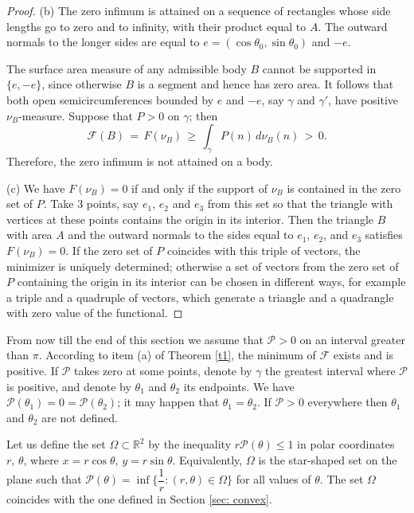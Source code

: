 \documentclass[a4paper,12pt]{article}
\newcommand {\FF}{F}
\newcommand {\FFF}{\mathcal{F}}
\newcommand {\PP}{P}
\newcommand {\PPP}{\mathcal{P}}
\theoremstyle{remark}
\theoremstyle{definition}
\begin{document}
\begin{proof}
(b) The zero infimum is attained on a sequence of rectangles whose side lengths go to zero and to infinity, with their product equal to $A$. The outward normals to the longer sides are equal to $e=(\cos\theta_0,\sin\theta_0)$ and $-e$.

The surface area measure of any admissible body $B$ cannot be supported in $\{ e, -e \}$, since otherwise $B$ is a segment and hence has zero area. It follows that both open semicircumferences bounded by $e$ and $-e$, say $\gamma$ and $\gamma'$, have positive $\nu_B$-measure. Suppose that $\PP >0$ on $\gamma$; then
$$
\FFF(B)\, = \, \FF(\nu_B) \, \ge\, \int_{\gamma} \PP (n)\, d\nu_B(n)\, >\, 0.
$$
Therefore, the zero infimum is not attained on a body.
	\vspace{2mm}

(c) We have $\FF(\nu_{B}) = 0$ if and only if the support of $\nu_B$ is contained in the zero set of $\PP$. Take 3 points, say $e_1,\, e_2$ and $e_3$ from this set so that the triangle with vertices at these points contains the origin in its interior. Then the triangle $B$ with area $A$ and the outward normals to the sides equal to $e_1,\, e_2$, and $e_3$ satisfies $\FF(\nu_B) = 0$. If the zero set of $\PP$ coincides with this triple of vectors, the minimizer is uniquely determined; otherwise a set of vectors from the zero set of $\PP$ containing the origin in its interior can be chosen in different ways, for example a triple and a quadruple of vectors, which generate a triangle and a quadrangle with zero value of the functional.
\end{proof}

From now till the end of this section we assume that $\PPP > 0$ on an interval greater than $\pi$. According to item (a) of Theorem \ref{t1}, the minimum of $\FFF$ exists and is positive. If $\PPP$ takes zero at some points, denote by $\gamma$ the greatest interval where $\PPP$ is positive, and denote by $\theta_1$ and $\theta_2$ its endpoints. We have $\PPP(\theta_1) = 0 = \PPP(\theta_2)$; it may happen that $\theta_1 = \theta_2$. If $\PPP>0$ everywhere then $\theta_1$ and $\theta_2$ are not defined.

Let us define the set $\Omega \subset \mathbb{R}^2$ by the inequality $r \PPP(\theta) \le 1$ in polar coordinates $r,\, \theta$, where $x=r\cos\theta,\, y=r\sin\theta$. Equivalently, $\Omega$ is the star-shaped set on the plane such that $\PPP(\theta) = \inf \Big\{ \dfrac{1}{r} : (r,\theta) \in \Omega \Big\}$ for all values of $\theta$. The set $\Omega$ coincides with the one defined in Section \ref{sec: convex}.
\end{document}
